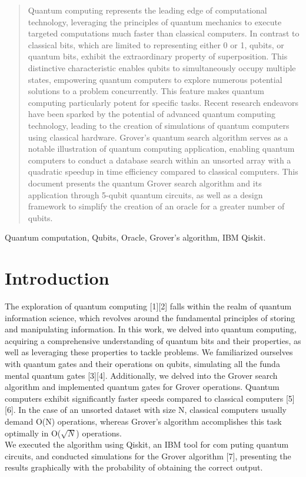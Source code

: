 \documentclass[conference]{IEEEtran}
\begin{document}
\begin{abstract}
	Quantum computing represents the leading edge of
	computational technology, leveraging the principles of quantum
	mechanics to execute targeted computations much faster than
	classical computers. In contrast to classical bits, which are limited
	to representing either 0 or 1, qubits, or quantum bits, exhibit
	the extraordinary property of superposition. This distinctive
	characteristic enables qubits to simultaneously occupy multiple
	states, empowering quantum computers to explore numerous
	potential solutions to a problem concurrently. This feature
	makes quantum computing particularly potent for specific tasks.
	Recent research endeavors have been sparked by the potential
	of advanced quantum computing technology, leading to the
	creation of simulations of quantum computers using classical
	hardware. Grover’s quantum search algorithm serves as a notable
	illustration of quantum computing application, enabling quantum
	computers to conduct a database search within an unsorted array
	with a quadratic speedup in time efficiency compared to classical
	computers. This document presents the quantum Grover search
	algorithm and its application through 5-qubit quantum circuits,
	as well as a design framework to simplify the creation of an
	oracle for a greater number of qubits.
\end{abstract}

\begin{IEEEkeywords}
	Quantum computation, Qubits, Oracle, Grover’s
	algorithm, IBM Qiskit.
\end{IEEEkeywords}

\section{Introduction}
The exploration of quantum computing [1][2] falls within
the realm of quantum information science, which revolves
around the fundamental principles of storing and manipulating
information. In this work, we delved into quantum computing,
acquiring a comprehensive understanding of quantum bits
and their properties, as well as leveraging these properties
to tackle problems. We familiarized ourselves with quantum
gates and their operations on qubits, simulating all the funda
mental quantum gates [3][4]. Additionally, we delved into the
Grover search algorithm and implemented quantum gates for
Grover operations. Quantum computers exhibit significantly
faster speeds compared to classical computers [5][6]. In the
case of an unsorted dataset with size N, classical computers
usually demand O(N) operations, whereas Grover’s algorithm
accomplishes this task optimally in O($\sqrt{N}$) operations.
\\
We
executed the algorithm using Qiskit, an IBM tool for com
puting quantum circuits, and conducted simulations for the
Grover algorithm [7], presenting the results graphically with
the probability of obtaining the correct output.
\end{document}
